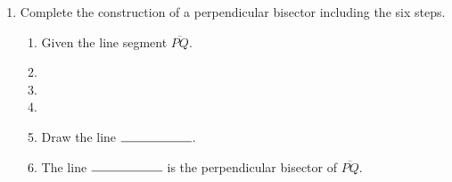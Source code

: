 \documentclass[12pt, oneside]{article}
\begin{document}
\begin{enumerate}
  \item Complete the construction of a perpendicular bisector including the six steps.
    \begin{enumerate}
      \item Given the line segment $\overline{PQ}$.
      \bigskip
      \item %
      \bigskip
      \item %
      \bigskip
      \item %
      \bigskip
      \item Draw the line $\rule{2cm}{0.15mm}$.
      \bigskip
      \item The line $\rule{2cm}{0.15mm}$ is the perpendicular bisector of $\overline{PQ}$.
    \end{enumerate}
    \vspace{7cm}
    \begin{center}
    \end{center}
\newpage



  \end{enumerate}
\end{document}
